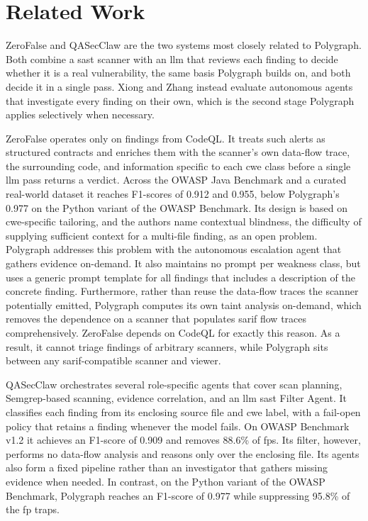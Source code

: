 \section{Related Work}

ZeroFalse and QASecClaw are the two systems most closely related to Polygraph.
Both combine a \ac{sast} scanner with an \ac{llm} that reviews each finding to
decide whether it is a real vulnerability, the same basis Polygraph builds on,
and both decide it in a single pass. Xiong and Zhang instead evaluate autonomous
agents that investigate every finding on their own, which is the second stage
Polygraph applies selectively when necessary.

ZeroFalse \cite{iranmanesh2025zerofalseimprovingprecisionstatic} operates only
on findings from CodeQL. It treats such alerts as structured contracts and
enriches them with the scanner's own data-flow trace, the surrounding code, and
information specific to each \ac{cwe} class before a
single \ac{llm} pass returns a verdict. Across the OWASP Java Benchmark and a curated
real-world dataset it reaches F1-scores of 0.912 and 0.955, below Polygraph's
0.977 on the Python variant of the OWASP Benchmark. Its design is based
on \ac{cwe}-specific tailoring, and the authors name contextual blindness, the
difficulty of supplying sufficient context for a multi-file finding, as an open
problem. Polygraph addresses this problem with the autonomous escalation agent that gathers evidence on-demand.
It also maintains no prompt per weakness class, but uses a generic
prompt template for all findings that includes a description of the concrete
finding. Furthermore, rather than reuse the data-flow traces the scanner potentially
emitted, Polygraph computes its own taint analysis on-demand,
which removes the dependence on a scanner that populates \ac{sarif} flow traces
comprehensively. ZeroFalse depends on CodeQL for exactly this reason. As a
result, it cannot triage findings of arbitrary scanners, while Polygraph sits
between any \ac{sarif}-compatible scanner and viewer.

QASecClaw \cite{ameen2026qasecclawmultiagentllmapproach} orchestrates several
role-specific agents that cover scan planning, Semgrep-based scanning, evidence
correlation, and an \ac{llm} \ac{sast} Filter Agent. It classifies each finding from its
enclosing source file and \ac{cwe} label, with a fail-open policy that retains a
finding whenever the model fails. On OWASP Benchmark v1.2 it achieves an F1-score
of 0.909 and removes 88.6\% of \acp{fp}. Its filter, however,
performs no data-flow analysis and reasons only over the enclosing file. Its
agents also form a fixed pipeline rather than an investigator that gathers
missing evidence when needed. In contrast, on the Python variant of the OWASP Benchmark,
Polygraph reaches an F1-score of 0.977 while suppressing 95.8\% of the \ac{fp} traps.

